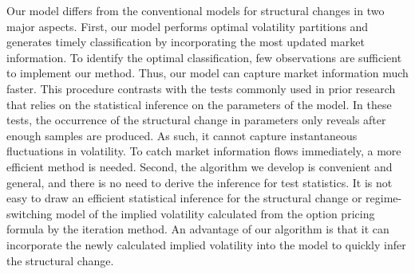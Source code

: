 \documentclass[preprint,12pt,authoryear]{elsarticle}
\begin{document}

Our model differs from the conventional models for structural changes in two major aspects.
First, our model performs optimal volatility partitions and generates timely classification by
incorporating the most updated market information.
To identify the optimal classification, few observations
are sufficient to implement our method.
Thus, our model can capture market information much faster. This procedure
contrasts with the tests commonly used in prior research that relies on the statistical inference on the
parameters of the model. In these tests, the occurrence of the structural change in parameters only reveals
after enough samples are produced. As such, it cannot capture instantaneous fluctuations in volatility.
To catch market information flows immediately, a more efficient method is needed. Second, the algorithm
we develop is convenient and general, and there is no need to derive the inference for test statistics.
It is not easy to draw an efficient statistical inference for the structural change or regime-switching
model of the implied volatility calculated from the option pricing formula by the iteration method.
An advantage of our algorithm is that it can incorporate the newly calculated implied volatility into the model
to quickly infer the structural change.

\end{document}
